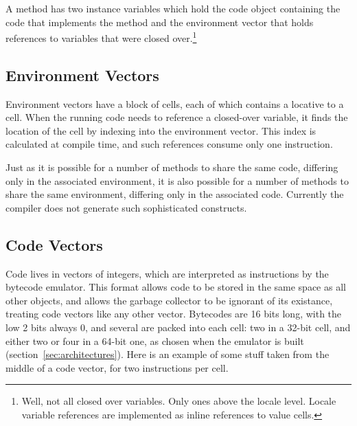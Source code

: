 A method has two instance variables which hold the code object
containing the code that implements the method and the environment
vector that holds references to variables that were closed
over.\footnote{Well, not all closed over variables.  Only ones above
the locale level.  Locale variable references are implemented as
inline references to value cells.}

\subsection{Environment Vectors}

Environment vectors have a block of cells, each of which contains a
locative to a cell.  When the running code needs to reference a
closed-over variable, it finds the location of the cell by indexing into
the environment vector.  This index is calculated at compile time, and such
references consume only one instruction.

Just as it is possible for a number of methods to share the same code,
differing only in the associated environment, it is also possible for
a number of methods to share the same environment, differing only in
the associated code.  Currently the compiler does not generate such
sophisticated constructs.

\subsection{Code Vectors} \label{sec:codeblock}

Code lives in vectors of integers, which are interpreted as
instructions by the bytecode emulator.  This format allows code to be
stored in the same space as all other objects, and allows the garbage
collector to be ignorant of its existance, treating code vectors like
any other vector.  Bytecodes are 16 bits long, with the low 2 bits
always 0, and several are packed into each cell: two in a 32-bit
cell, and either two or four in a 64-bit one, as chosen when the
emulator is built (section~\ref{sec:architectures}).  Here is an
example of some stuff taken from the middle of a code vector, for two
instructions per cell.

